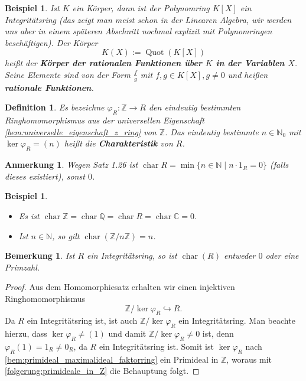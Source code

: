 \documentclass[a4paper, twoside, 11pt, ngerman]{report}
\newcommand{\CC}{\mathds C}
\newcommand{\NN}{\mathds N}
\newcommand{\QQ}{\mathds Q}
\newcommand{\ZZ}{\mathds Z}
\DeclareMathOperator{\charact}{char}
\DeclareMathOperator{\Quot}{Quot}
\theoremstyle{definistyle}
\newtheorem{defini}[satz]{Definition}
\newtheorem{bem}[satz]{Bemerkung}
\newtheorem{anm}[satz]{Anmerkung}
\newtheorem{bsp}[satz]{Beispiel}
\theoremstyle{remark}
\newcommand{\defn}[1]{\textit{\bfseries #1}}
\begin{document}
\begin{bsp}
Ist $K$ ein Körper, dann ist der Polynomring $K[X]$ ein Integritätsring (das zeigt man meist
schon in der Linearen Algebra, wir werden uns aber in einem späteren Abschnitt nochmal explizit
mit Polynomringen beschäftigen). Der Körper
\[
K(X):=\Quot(K[X])
\]
heißt der \defn{Körper der rationalen Funktionen über $K$ in der Variablen $X$}. Seine Elemente
sind von der Form $\frac{f}{g}$ mit $f,g\in K[X],g\neq 0$ und heißen \defn{rationale Funktionen}.
\end{bsp}

\begin{defini}\label{def:charakteristik}
Es bezeichne $\varphi_R\colon\ZZ\to R$ den eindeutig bestimmten Ringhomomorphismus aus der universellen Eigenschaft \ref{bem:universelle_eigenschaft_z_ring} von $\ZZ$.
Das eindeutig bestimmte $n \in \NN_0$ mit $\ker \varphi_R = (n)$ heißt die \defn{Charakteristik} von $R$.
\end{defini}

\begin{anm}\label{anm:charakteristik}
Wegen Satz 1.26 ist $\charact R = \min \{ n \in \NN \mid n \cdot 1_R = 0 \}$ (falls dieses existiert), sonst $0$.
\end{anm}

\begin{bsp}\label{bsp:charakteristik_beispiele}
\begin{itemize}
    \item[(a)] Es ist $\charact \ZZ = \charact \QQ = \charact R = \charact \CC = 0$.
    \item[(b)] Ist $n\in\NN$, so gilt $\charact (\ZZ / n\ZZ) = n$.
\end{itemize}
\end{bsp}

\begin{bem}\label{bem:charakteristik_primzahl}
Ist $R$ ein Integritätsring, so ist $\charact(R)$ entweder $0$ oder eine Primzahl.
\end{bem}

\begin{proof}
Aus dem Homomorphiesatz erhalten wir einen injektiven Ringhomomorphismus
\[
\ZZ / \ker \varphi_R \hookrightarrow R.
\]
Da $R$ ein Integritätsring ist, ist auch $\ZZ / \ker \varphi_R$ ein Integritätsring. Man beachte hierzu, dass $\ker \varphi_R \neq (1)$ und damit $\ZZ / \ker \varphi_R \neq 0$ ist, denn $\varphi_R(1) = 1_R \neq 0_R$, da $R$ ein Integritätsring ist. Somit ist $\ker \varphi_R$ nach \ref{bem:primideal_maximalideal_faktorring} ein Primideal in $\ZZ$, woraus mit \ref{folgerung:primideale_in_Z} die Behauptung folgt.
\end{proof}
\end{document}
